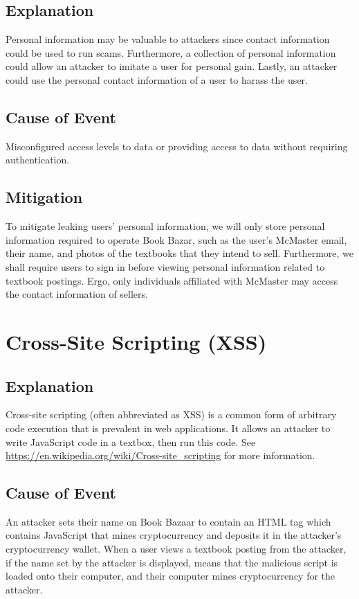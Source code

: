 \documentclass[fullpage]{article}
\begin{document}
\subsection*{Explanation}
Personal information may be valuable to attackers since contact information could be used to run scams. Furthermore, a collection of personal information could allow an attacker to imitate a user for personal gain. Lastly, an attacker could use the personal contact information of a user to harass the user.
\subsection*{Cause of Event}
Misconfigured access levels to data or providing access to data without requiring authentication.
\subsection*{Mitigation}
To mitigate leaking users’ personal information, we will only store personal information required to operate Book Bazar, such as the user’s McMaster email, their name, and photos of the textbooks that they intend to sell. Furthermore, we shall require users to sign in before viewing personal information related to textbook postings. Ergo, only individuals affiliated with McMaster may access the contact information of sellers.

\section{Cross-Site Scripting (XSS)}

\subsection*{Explanation}
Cross-site scripting (often abbreviated as XSS) is a common form of arbitrary code execution that is prevalent in web applications. It allows an attacker to write JavaScript code in a textbox, then run this code. See \url{https://en.wikipedia.org/wiki/Cross-site_scripting}  for more information.

\subsection*{Cause of Event}
An attacker sets their name on Book Bazaar to contain an HTML tag which contains JavaScript that mines cryptocurrency and deposits it in the attacker’s cryptocurrency wallet. When a user views a textbook posting from the attacker, if the name set by the attacker is displayed, means that the malicious script is loaded onto their computer, and their computer mines cryptocurrency for the attacker.
\end{document}
